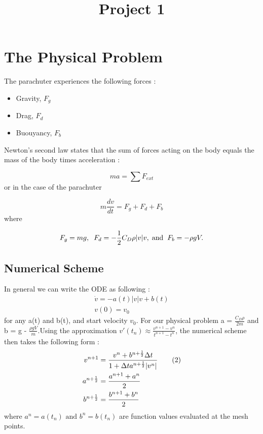 \documentclass[11pt]{article} %
\title{Project 1}
\date{}
\begin{document}
\maketitle

\section{The Physical Problem}

The parachuter experiences the following forces :
\begin{itemize}
\item Gravity, $F_g$
\item Drag, $F_d$
\item Buouyancy, $F_b$
\end{itemize}
Newton's second law states that the sum of forces acting on the body equals the mass of the body times acceleration :

\[ ma = \sum F_{ext}\]
or in the case of the parachuter

\[ m\frac{dv}{dt} = F_g + F_d + F_b\]
where

\begin{equation*}
F_g = mg, \hspace{2mm}
F_d = -\frac{1}{2}C_D\rho|v|v, \hspace{1mm} \text{and} \hspace{2mm}
F_b = -\rho gV.
\end{equation*}

\subsection{Numerical Scheme}
In general we can write the ODE as following :
\begin{align} 
\dot{v} = -a(t)|v|v + b(t) \label{eq:1} \tag{1.a}\\
     v(0) = v_0 \tag{1.b}
\end{align}
for any a(t) and b(t), and start velocity $v_0$. For our physical problem  a = $\frac{C_D \rho}{2m}$ 
and b = g - $\frac{\rho gV}{m}$.Using the approximation $v'(t_n) \approx \frac{v^{n+1} - v^n}
{t^{n+1} - t^n} $, the numerical scheme then takes the following form :\\
\begin{align}
v^{n+1} &= \frac{v^n + b^{n+\frac{1}{2}}\Delta t}{1 + \Delta t a^{n+\frac{1}{2} }|v^n|}  
\label{eq:2} \tag{2}\\
a^{n+\frac{1}{2}} &= \frac{a^{n+1}+a^n}{2} \notag\\
b^{n+\frac{1}{2}} &= \frac{b^{n+1}+b^n}{2} \notag
\end{align}
where $a^{n} = a(t_n) \text{ and } b^{n}  = b(t_n)$ are function values evaluated at the mesh points.
\end{document}

